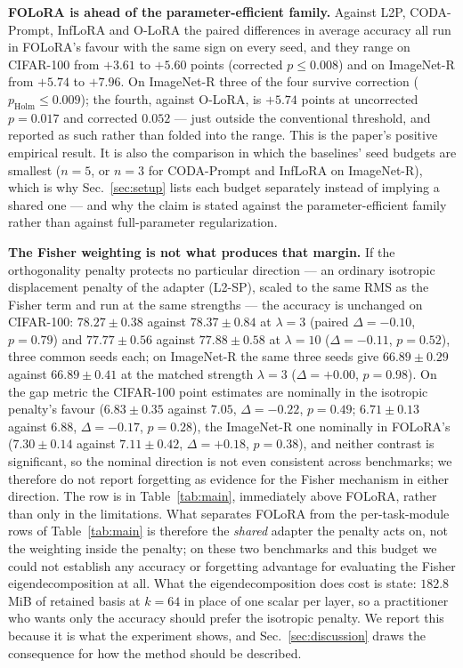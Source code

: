 \textbf{FOLoRA is ahead of the parameter-efficient family.} Against L2P, CODA-Prompt,
InfLoRA and O-LoRA the paired differences in average accuracy all run in FOLoRA's favour with
the same sign on every seed, and they range on CIFAR-100 from $+3.61$ to $+5.60$ points
(corrected $p\le0.008$) and on ImageNet-R from $+5.74$ to $+7.96$. On ImageNet-R three of the
four survive correction ($p_{\mathrm{Holm}}\le0.009$); the fourth, against O-LoRA, is $+5.74$
points at uncorrected $p=0.017$ and corrected $0.052$ --- just outside the conventional
threshold, and reported as such rather than folded into the range. This is the paper's
positive empirical result. It is also the comparison in which the baselines' seed budgets are
smallest ($n=5$, or $n=3$ for CODA-Prompt and InfLoRA on ImageNet-R), which is why
Sec.~\ref{sec:setup} lists each budget separately instead of implying a shared one --- and
why the claim is stated against the parameter-efficient family rather than against
full-parameter regularization.

\textbf{The Fisher weighting is not what produces that margin.} If the orthogonality penalty
protects no particular direction --- an ordinary isotropic displacement penalty of the adapter
(L2-SP), scaled to the same RMS as the Fisher term and run at the same strengths --- the
accuracy is unchanged on CIFAR-100: $78.27\pm0.38$ against $78.37\pm0.84$ at $\lambda=3$
(paired $\Delta=-0.10$, $p=0.79$) and $77.77\pm0.56$ against $77.88\pm0.58$ at $\lambda=10$
($\Delta=-0.11$, $p=0.52$), three common seeds each; on ImageNet-R the same three seeds give
$66.89\pm0.29$ against $66.89\pm0.41$ at the matched strength $\lambda=3$
($\Delta=+0.00$, $p=0.98$). On the gap metric the CIFAR-100 point estimates are nominally in
the isotropic penalty's favour ($6.83\pm0.35$ against $7.05$, $\Delta=-0.22$, $p=0.49$;
$6.71\pm0.13$ against $6.88$, $\Delta=-0.17$, $p=0.28$), the ImageNet-R one nominally in
FOLoRA's ($7.30\pm0.14$ against $7.11\pm0.42$, $\Delta=+0.18$, $p=0.38$), and neither contrast
is significant, so the nominal direction is not even consistent across benchmarks; we
therefore do not report forgetting as evidence for the Fisher mechanism in either direction.
The row is in Table~\ref{tab:main}, immediately above FOLoRA, rather than only in the
limitations.
What separates FOLoRA from the per-task-module rows of Table~\ref{tab:main} is therefore the
\emph{shared} adapter the penalty acts on, not the weighting inside the penalty; on these two
benchmarks and this budget we could not establish any accuracy or forgetting advantage for
evaluating the Fisher eigendecomposition at all. What the eigendecomposition does cost is
state: $182.8$\,MiB of retained basis at $k{=}64$ in place of one scalar per layer, so a
practitioner who wants only the accuracy should prefer the isotropic penalty. We report this
because it is what the experiment shows, and Sec.~\ref{sec:discussion} draws the consequence
for how the method should be described.

